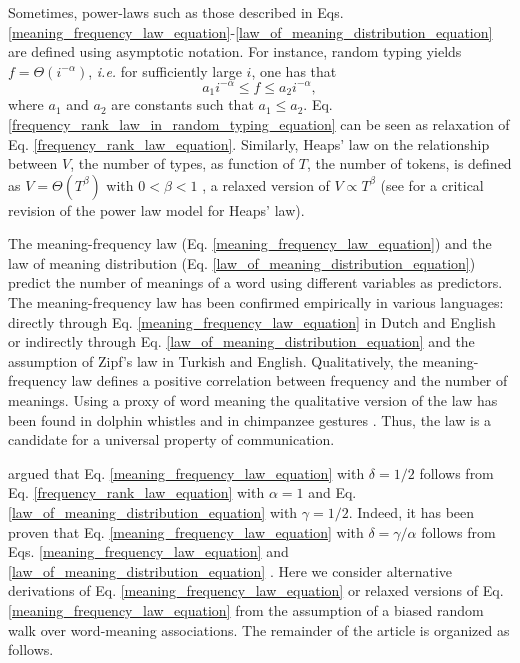 \documentclass{article}
\begin{document}
Sometimes, power-laws such as those described in Eqs. \ref{meaning_frequency_law_equation}-\ref{law_of_meaning_distribution_equation} are defined using asymptotic notation. For instance, random typing yields $f = \Theta(i^{-\alpha})$, {\em i.e.} for sufficiently large $i$, one has that \cite{Conrad2004a} 
\begin{equation}
a_1 i^{-\alpha} \leq f \leq a_2 i^{-\alpha},
\label{frequency_rank_law_in_random_typing_equation}
\end{equation}
where $a_1$ and $a_2$ are constants such that $a_1 \leq a_2$. Eq. \ref{frequency_rank_law_in_random_typing_equation} can be seen as relaxation of Eq. \ref{frequency_rank_law_equation}. Similarly, Heaps' law on the relationship between $V$, the number of types, as function of $T$, the number of tokens, is defined as $V = \Theta(T^\beta)$ with $0 < \beta < 1$ \cite{Baeza_Yates2000a}, a relaxed version of $V \propto T^\beta$ (see  for a critical revision of the power law model for Heaps' law). 

The meaning-frequency law (Eq. \ref{meaning_frequency_law_equation}) and the law of meaning distribution (Eq. \ref{law_of_meaning_distribution_equation}) predict the number of meanings of a word using different variables as predictors. The meaning-frequency law has been confirmed empirically in various languages: directly through Eq. \ref{meaning_frequency_law_equation} in Dutch and English \cite{Baayen2005a} or indirectly through Eq. \ref{law_of_meaning_distribution_equation} and the assumption of Zipf's law \cite{Zipf1945a, Ilgen2007a} in Turkish and English. Qualitatively, 
the meaning-frequency law defines a positive correlation between frequency and the number of meanings. Using a proxy of word meaning the qualitative version of the law has been found in dolphin whistles \cite{Ferrer2009f} and in chimpanzee gestures \cite{Hobaiter2014a}. Thus, the law is a candidate for a universal property of communication.

 argued that Eq. \ref{meaning_frequency_law_equation} with $\delta= 1/2$ follows from Eq. \ref{frequency_rank_law_equation} with $\alpha = 1$ and Eq. \ref{law_of_meaning_distribution_equation} with $\gamma = 1/2$. Indeed, it has been proven that Eq. \ref{meaning_frequency_law_equation} with $\delta = \gamma/\alpha$ follows from Eqs. \ref{meaning_frequency_law_equation} and \ref{law_of_meaning_distribution_equation} \cite{Ferrer2014d}.  Here we consider alternative derivations of Eq. 
\ref{meaning_frequency_law_equation} or relaxed versions of Eq. 
\ref{meaning_frequency_law_equation} from the assumption of a biased random walk \cite{Sinatra2011a,Gomez-Gardenes2008a} over word-meaning associations. The remainder of the article is organized as follows. 
\end{document}
